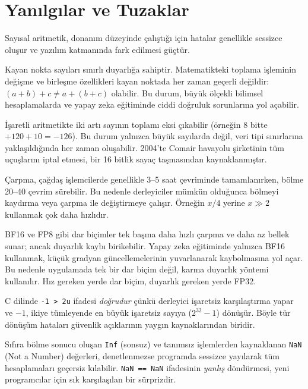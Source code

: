 \section{Yanılgılar ve Tuzaklar}
\label{sec:aritmetik-yanilgilar}

Sayısal aritmetik, donanım düzeyinde çalıştığı için hatalar genellikle sessizce oluşur ve yazılım katmanında fark edilmesi güçtür.

Kayan nokta sayıları sınırlı duyarlığa sahiptir. Matematikteki toplama işleminin değişme ve birleşme özellikleri kayan noktada her zaman geçerli değildir: $(a + b) + c \neq a + (b + c)$ olabilir. Bu durum, büyük ölçekli bilimsel hesaplamalarda ve yapay zeka eğitiminde ciddi doğruluk sorunlarına yol açabilir.

İşaretli aritmetikte iki artı sayının toplamı eksi çıkabilir (örneğin 8 bitte $+120 + 10 = -126$). Bu durum yalnızca büyük sayılarda değil, veri tipi sınırlarına yaklaşıldığında her zaman oluşabilir. 2004'te Comair havayolu şirketinin tüm uçuşlarını iptal etmesi, bir 16 bitlik sayaç taşmasından kaynaklanmıştır.

Çarpma, çağdaş işlemcilerde genellikle 3--5 saat çevriminde tamamlanırken, bölme 20--40 çevrim sürebilir. Bu nedenle derleyiciler mümkün olduğunca bölmeyi kaydırma veya çarpma ile değiştirmeye çalışır. Örneğin $x / 4$ yerine $x \gg 2$ kullanmak çok daha hızlıdır.

BF16 ve FP8 gibi dar biçimler tek başına daha hızlı çarpma ve daha az bellek sunar; ancak duyarlık kaybı birikebilir. Yapay zeka eğitiminde yalnızca BF16 kullanmak, küçük gradyan güncellemelerinin yuvarlanarak kaybolmasına yol açar. Bu nedenle uygulamada tek bir dar biçim değil, karma duyarlık yöntemi kullanılır. Hız gereken yerde dar biçim, duyarlık gereken yerde FP32.

C dilinde \texttt{-1 > 2u} ifadesi \emph{doğrudur} çünkü derleyici işaretsiz karşılaştırma yapar ve $-1$, ikiye tümleyende en büyük işaretsiz sayıya ($2^{32}-1$) dönüşür. Böyle tür dönüşüm hataları güvenlik açıklarının yaygın kaynaklarından biridir.

Sıfıra bölme sonucu oluşan \texttt{Inf} (sonsuz) ve tanımsız işlemlerden kaynaklanan \texttt{NaN} (Not a Number) değerleri, denetlenmezse programda sessizce yayılarak tüm hesaplamaları geçersiz kılabilir. \texttt{NaN == NaN} ifadesinin \emph{yanlış} döndürmesi, yeni programcılar için sık karşılaşılan bir sürprizdir.

